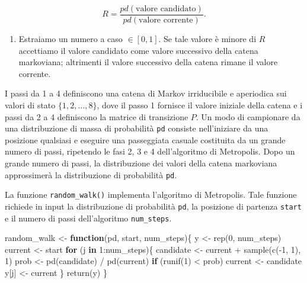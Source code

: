 \documentclass[
  11pt,
]{krantz}
\makeatletter
\newenvironment{Shaded}{\begin{snugshade}}{\end{snugshade}}
\newcommand{\ControlFlowTok}[1]{\textcolor[rgb]{0.27,0.27,0.27}{\textbf{#1}}}
\newcommand{\DecValTok}[1]{\textcolor[rgb]{0.06,0.06,0.06}{#1}}
\newcommand{\FunctionTok}[1]{\textcolor[rgb]{0,0,0}{#1}}
\newcommand{\NormalTok}[1]{#1}
\newcommand{\OtherTok}[1]{\textcolor[rgb]{0.37,0.37,0.37}{#1}}
\newcommand{\SpecialCharTok}[1]{\textcolor[rgb]{0,0,0}{#1}}
\providecommand{\tightlist}{%
  \setlength{\itemsep}{0pt}\setlength{\parskip}{0pt}}
\newenvironment{kframe}{%
\medskip{}
\setlength{\fboxsep}{.8em}
 \def\at@end@of@kframe{}%
 \ifinner\ifhmode%
  \def\at@end@of@kframe{\end{minipage}}%
  \begin{minipage}{\columnwidth}%
 \fi\fi%
 \def\FrameCommand##1{\hskip\@totalleftmargin \hskip-\fboxsep
 \colorbox{shadecolor}{##1}\hskip-\fboxsep
     \hskip-\linewidth \hskip-\@totalleftmargin \hskip\columnwidth}%
 \MakeFramed {\advance\hsize-\width
   \@totalleftmargin\z@ \linewidth\hsize
   \@setminipage}}%
 {\par\unskip\endMakeFramed%
 \at@end@of@kframe}
\renewenvironment{Shaded}{\begin{kframe}}{\end{kframe}}
\theoremstyle{definition}
\theoremstyle{definition}
\theoremstyle{definition}
\theoremstyle{definition}
\theoremstyle{remark}
\makeatother
\begin{document}
\[
R = \frac{pd(\text{valore candidato})}{pd(\text{valore corrente})}.
\]

\begin{enumerate}
\def\labelenumi{\arabic{enumi}.}
\setcounter{enumi}{3}
\tightlist
\item
  Estraiamo un numero a caso \(\in [0, 1]\). Se tale valore è minore di \(R\) accettiamo il valore candidato come valore successivo della catena markoviana; altrimenti il valore successivo della catena rimane il valore corrente.
\end{enumerate}

I passi da 1 a 4 definiscono una catena di Markov irriducibile e aperiodica sui valori di stato \(\{1, 2,\dots, 8\}\), dove il passo 1 fornisce il valore iniziale della catena e i passi da 2 a 4 definiscono la matrice di transizione \(P\). Un modo di campionare da una distribuzione di massa di probabilità \texttt{pd} consiste nell'iniziare da una posizione qualsiasi e eseguire una passeggiata casuale costituita da un grande numero di passi, ripetendo le fasi 2, 3 e 4 dell'algoritmo di Metropolis. Dopo un grande numero di passi, la distribuzione dei valori della catena markoviana approssimerà la distribuzione di probabilità \texttt{pd}.

La funzione \texttt{random\_walk()} implementa l'algoritmo di Metropolis. Tale funzione richiede in input la distribuzione di probabilità \texttt{pd}, la posizione di partenza \texttt{start} e il numero di passi dell'algoritmo \texttt{num\_steps}.

\begin{Shaded}
\begin{Highlighting}[]
\NormalTok{random\_walk }\OtherTok{\textless{}{-}} \ControlFlowTok{function}\NormalTok{(pd, start, num\_steps)\{}
\NormalTok{  y }\OtherTok{\textless{}{-}} \FunctionTok{rep}\NormalTok{(}\DecValTok{0}\NormalTok{, num\_steps)}
\NormalTok{  current }\OtherTok{\textless{}{-}}\NormalTok{ start}
  \ControlFlowTok{for}\NormalTok{ (j }\ControlFlowTok{in} \DecValTok{1}\SpecialCharTok{:}\NormalTok{num\_steps)\{}
\NormalTok{    candidate }\OtherTok{\textless{}{-}}\NormalTok{ current }\SpecialCharTok{+} \FunctionTok{sample}\NormalTok{(}\FunctionTok{c}\NormalTok{(}\SpecialCharTok{{-}}\DecValTok{1}\NormalTok{, }\DecValTok{1}\NormalTok{), }\DecValTok{1}\NormalTok{)}
\NormalTok{    prob }\OtherTok{\textless{}{-}} \FunctionTok{pd}\NormalTok{(candidate) }\SpecialCharTok{/} \FunctionTok{pd}\NormalTok{(current)}
    \ControlFlowTok{if}\NormalTok{ (}\FunctionTok{runif}\NormalTok{(}\DecValTok{1}\NormalTok{) }\SpecialCharTok{\textless{}}\NormalTok{ prob)}
\NormalTok{      current }\OtherTok{\textless{}{-}}\NormalTok{ candidate}
\NormalTok{    y[j] }\OtherTok{\textless{}{-}}\NormalTok{ current}
\NormalTok{  \}}
  \FunctionTok{return}\NormalTok{(y)}
\NormalTok{\}}
\end{Highlighting}
\end{Shaded}
\end{document}
